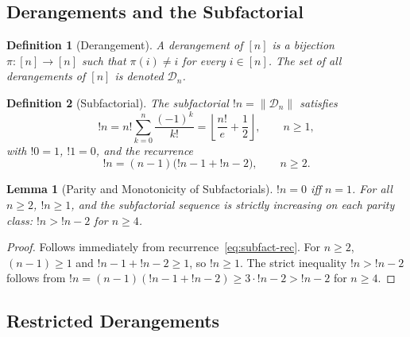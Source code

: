 \documentclass[11pt,a4paper]{article}
\newtheorem{lemma}[theorem]{Lemma}
\newtheorem{definition}{Definition}[section]
\newcommand{\subfact}[1]{!{#1}} %
\begin{document}
    \subsection{Derangements and the Subfactorial}

    \begin{definition}[Derangement]
        \label{def:derangement}
        A \emph{derangement} of $[n]$ is a bijection $\pi:[n]\to[n]$ such that
        $\pi(i) \neq i$ for every $i \in [n]$. The set of all derangements of $[n]$
        is denoted $\mathcal{D}_n$.
    \end{definition}

    \begin{definition}[Subfactorial]
        \label{def:subfactorial}
        The \emph{subfactorial} $\subfact{n} = \|\mathcal{D}_n\|$ satisfies
        \begin{equation}
            \subfact{n} = n! \sum_{k=0}^{n} \frac{(-1)^k}{k!}
            = \left\lfloor \frac{n!}{e} + \frac{1}{2} \right\rfloor,
            \qquad n \geq 1,
            \label{eq:subfact-closed}
        \end{equation}
        with $\subfact{0}=1$, $\subfact{1}=0$, and the recurrence
        \begin{equation}
            \subfact{n} = (n-1)\bigl(\subfact{n-1} + \subfact{n-2}\bigr),
            \qquad n \geq 2.
            \label{eq:subfact-rec}
        \end{equation}
    \end{definition}

    \begin{lemma}[Parity and Monotonicity of Subfactorials]
        \label{lem:subfact-parity}
        $\subfact{n} = 0$ iff $n=1$. For all $n \geq 2$, $\subfact{n} \geq 1$, and
        the subfactorial sequence is strictly increasing on each parity class:
        $\subfact{n} > \subfact{n-2}$ for $n \geq 4$.
    \end{lemma}

    \begin{proof}
        Follows immediately from recurrence~\eqref{eq:subfact-rec}. For $n \geq 2$,
        $(n-1) \geq 1$ and $\subfact{n-1} + \subfact{n-2} \geq 1$, so $\subfact{n} \geq 1$.
        The strict inequality $\subfact{n} > \subfact{n-2}$ follows from
        $\subfact{n} = (n-1)(\subfact{n-1} + \subfact{n-2}) \geq 3 \cdot \subfact{n-2} > \subfact{n-2}$
        for $n \geq 4$.
    \end{proof}

    \subsection{Restricted Derangements}
\end{document}
